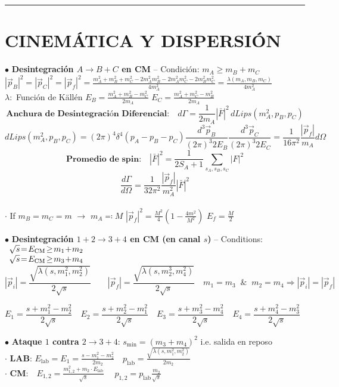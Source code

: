 \hrule

\section{CINEMÁTICA Y DISPERSIÓN }
$\bullet$ \textbf{Desintegración $A \rightarrow B+C$ en CM} -- Condición: $m_A \geq m_B + m_C$\\
$|\vec{p}_B|^2\!= \!|\vec{p}_C|^2\! = \!|\vec{p}_f|^2 \!=\! \frac{m_A^2+m_B^2 +m_C^2 - 2m_A^2m_B^2 - 2m_A^2 m_C^2 - 2m_B^2 m_C^2}{4m_A^2}\!\! = \!\!\frac{\lambda(m_A, m_B, m_C)}{4m_A^2}$\\
$\lambda:$ Función de Källén \quad $E_B = \frac{m_A^2 + m_B^2 - m_C^2}{2m_A}$ \quad $E_C = \frac{m_A^2 + m_C^2 - m_B^2}{2m_A}$\\
$$ \textbf{Anchura de Desintegración Diferencial:}  \quad d \Gamma = \frac{1}{2m_A} |\bar{F}|^2 \, d{Lips}(m_A^2, p_B, p_C) $$
$$ d{Lips}(m_A^2, p_B, p_C) = (2\pi)^4 \delta^4(p_A - p_B - p_C) \frac{d^3\vec{p}_B}{(2\pi)^3 2E_B} \frac{d^3\vec{p}_C}{(2\pi)^3 2E_C} = \frac{1}{16\pi^2} \frac{|\vec{p}_f|}{m_A} d\Omega $$
$$ \textbf{Promedio de spin:}\quad|\bar{F}|^2 = \frac{1}{2S_A+1} \sum_{s_A, s_B, s_C} |F|^2 $$
$$ \frac{d\Gamma}{d\Omega} = \frac{1}{32\pi^2} \frac{|\vec{p}_f|}{m_A^2} |\bar{F}|^2 $$
\\
$\cdot$ If {$m_B = m_C = m$} $\rightarrow$ $m_A \eqqcolon M$ \quad $|\vec{p}_f|^2 = \frac{M^2}{4} \left(1-\frac{4m^2}{M^2}\right)$ \quad $E_f = \frac{M}{2}$

$\bullet$ \textbf{Desintegración $1+2 \rightarrow 3+4$ en CM (en canal $s$)} -- Conditions: \hspace{-5pt}$\begin{array}{cc}
     \sqrt{s} \!=\!E_{\rm CM}\!\geq\! m_1 \!+\!m_2 \\
      \sqrt{s} \!=\!E_{\rm CM} \!\geq \!m_3 \!+\! m_4
\end{array}$\\

$$|\vec{p}_i| = \frac{\sqrt{\lambda (s, m_1^2, m_2^2)}}{2\sqrt{s}} \qquad |\vec{p}_f| = \frac{\sqrt{\lambda (s, m_2^3, m_4^2)}}{2\sqrt{s}}  \quad m_1 =m_3 \;\; \& \;\; m_2=m_4 \Rightarrow |\vec{p}_i| = |\vec{p}_f| $$

$$E_1 = \frac{s + m_1^2 - m_2^2}{2\sqrt{s}} \quad  E_2 = \frac{s + m_2^2 - m_1^2}{2\sqrt{s}} \quad E_3= \frac{s + m_3^2 - m_4^2}{2\sqrt{s}} \quad E_4 = \frac{s + m_4^2 - m_3^2}{2\sqrt{s}} \quad $$

 $\bullet$ \textbf{Ataque $1$ contra $2\rightarrow 3+4$}: $s_{\min} = (m_3 +m_4)^2$ \; i.e. salida en reposo\\
$\cdot$ \textbf{LAB}: $E_{\text{lab}} = E_1 = \frac{s-m_1^2 - m_2^2}{2m_2}\quad p_\text{lab} = \frac{\sqrt{\lambda(s,m_1^2, m_2^2)}}{2m_2}$ \\
 $\cdot$ \textbf{CM}:\, \, $E_{1,2} = \frac{m_{1,2}^2+m_2\cdot E_{\text{lab}} }{\sqrt{s}}\quad\; p_{1,2} = p_{\text{lab}}\frac{m_2}{\sqrt{s}}$



